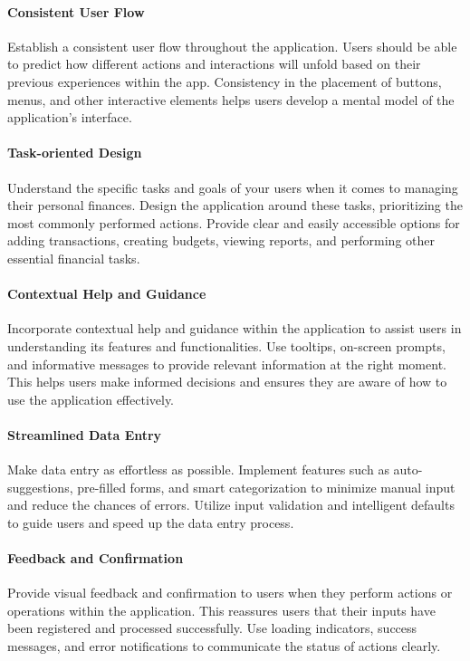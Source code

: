 \paragraph{Consistent User Flow}
Establish a consistent user flow throughout the application. Users should be able to 
predict how different actions and interactions will unfold based on their previous experiences within the app. 
Consistency in the placement of buttons, menus, and other interactive elements helps users develop a mental model 
of the application's interface.

\paragraph{Task-oriented Design}
Understand the specific tasks and goals of your users when it comes to managing their 
personal finances. Design the application around these tasks, prioritizing the most commonly performed actions. 
Provide clear and easily accessible options for adding transactions, creating budgets, viewing reports, and 
performing other essential financial tasks.

\paragraph{Contextual Help and Guidance}
Incorporate contextual help and guidance within the application to assist users in 
understanding its features and functionalities. Use tooltips, on-screen prompts, and informative messages to 
provide relevant information at the right moment. This helps users make informed decisions and ensures they are 
aware of how to use the application effectively.

\paragraph{Streamlined Data Entry}
Make data entry as effortless as possible. Implement features such as auto-suggestions, 
pre-filled forms, and smart categorization to minimize manual input and reduce the chances of errors. Utilize 
input validation and intelligent defaults to guide users and speed up the data entry process.

\paragraph{Feedback and Confirmation}
Provide visual feedback and confirmation to users when they perform actions or operations 
within the application. This reassures users that their inputs have been registered and processed successfully. 
Use loading indicators, success messages, and error notifications to communicate the status of actions clearly.

